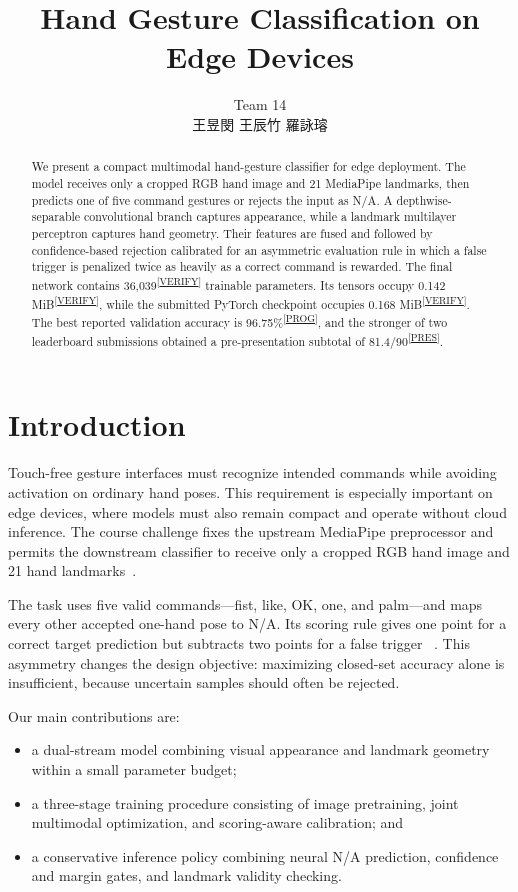\documentclass[10pt,twocolumn,a4paper]{article}
\title{\vspace{-1.4em}\textbf{Hand Gesture Classification on Edge Devices}}
\author{Team 14\\[2pt]
  {\zhfont 王昱閔 \quad 王辰竹 \quad 羅詠璿}}
\date{}
\newcommand{\evidence}[1]{\textsuperscript{\scriptsize[\hyperref[ev:#1]{#1}]}}
\newcommand{\result}[2]{#1\evidence{#2}}
\begin{document}
\maketitle
\thispagestyle{fancy}

\begin{abstract}
We present a compact multimodal hand-gesture classifier for edge deployment.
The model receives only a cropped RGB hand image and 21 MediaPipe landmarks,
then predicts one of five command gestures or rejects the input as N/A. A
depthwise-separable convolutional branch captures appearance, while a
landmark multilayer perceptron captures hand geometry. Their features are
fused and followed by confidence-based rejection calibrated for an asymmetric
evaluation rule in which a false trigger is penalized twice as heavily as a
correct command is rewarded. The final network contains
\result{36,039}{VERIFY} trainable parameters. Its tensors occupy
\result{0.142 MiB}{VERIFY}, while the submitted PyTorch checkpoint occupies
\result{0.168 MiB}{VERIFY}. The best reported validation accuracy is
\result{96.75\%}{PROG}, and the stronger of two leaderboard submissions
obtained a pre-presentation subtotal of \result{81.4/90}{PRES}.
\end{abstract}

\section{Introduction}
\label{sec:introduction}

Touch-free gesture interfaces must recognize intended commands while avoiding
activation on ordinary hand poses. This requirement is especially important
on edge devices, where models must also remain compact and operate without
cloud inference. The course challenge fixes the upstream MediaPipe
preprocessor and permits the downstream classifier to receive only a cropped
RGB hand image and 21 hand landmarks~\cite{courseSpec,zhang2020mediapipehands}.

The task uses five valid commands---fist, like, OK, one, and palm---and maps
every other accepted one-hand pose to N/A. Its scoring rule gives one point
for a correct target prediction but subtracts two points for a false trigger
~\cite{courseSpec}. This asymmetry changes the design objective: maximizing
closed-set accuracy alone is insufficient, because uncertain samples should
often be rejected.

Our main contributions are:
\begin{itemize}
  \item a dual-stream model combining visual appearance and landmark geometry
        within a small parameter budget;
  \item a three-stage training procedure consisting of image pretraining,
        joint multimodal optimization, and scoring-aware calibration; and
  \item a conservative inference policy combining neural N/A prediction,
        confidence and margin gates, and landmark validity checking.
\end{itemize}
\end{document}
